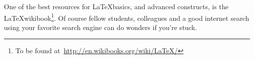 One of the best resources for \LaTeX basics, and advanced constructs, is the \LaTeX wikibook\footnote{To be found at~\url{http://en.wikibooks.org/wiki/LaTeX/}}. Of course fellow students, colleagues and a good internet search using your favorite search engine can do wonders if you're stuck.